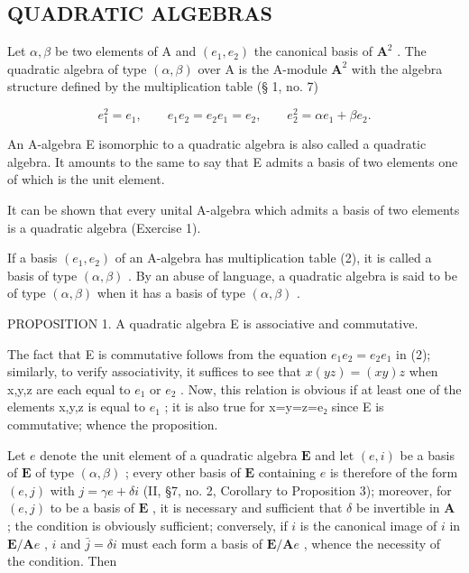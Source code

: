 \subsection{QUADRATIC ALGEBRAS}

Let \(\alpha, \beta\) be two elements of A and \((e_1, e_2)\) the canonical basis of \(\mathbf{A}^2\) . The quadratic algebra of type \((\alpha, \beta)\) over A is the A-module \(\mathbf{A}^2\) with the algebra structure defined by the multiplication table (§ 1, no. 7)

\[
e _ {1} ^ {2} = e _ {1}, \qquad e _ {1} e _ {2} = e _ {2} e _ {1} = e _ {2}, \qquad e _ {2} ^ {2} = \alpha e _ {1} + \beta e _ {2}.\tag{2}
\]

An A-algebra E isomorphic to a quadratic algebra is also called a quadratic algebra. It amounts to the same to say that E admits a basis of two elements one of which is the unit element.

It can be shown that every unital A-algebra which admits a basis of two elements is a quadratic algebra (Exercise 1).

If a basis \((e_{1}, e_{2})\) of an A-algebra has multiplication table (2), it is called a basis of type \((\alpha, \beta)\) . By an abuse of language, a quadratic algebra is said to be of type \((\alpha, \beta)\) when it has a basis of type \((\alpha, \beta)\) .

PROPOSITION 1. A quadratic algebra E is associative and commutative.

The fact that E is commutative follows from the equation \(e_{1}e_{2}=e_{2}e_{1}\) in (2); similarly, to verify associativity, it suffices to see that \(x(yz)=(xy)z\) when x,y,z are each equal to \(e_{1}\) or \(e_{2}\) . Now, this relation is obvious if at least one of the elements x,y,z is equal to \(e_{1}\) ; it is also true for x=y=z=e₂ since E is commutative; whence the proposition.

Let \(e\) denote the unit element of a quadratic algebra \(\mathbf{E}\) and let \((e, i)\) be a basis of \(\mathbf{E}\) of type \((\alpha, \beta)\) ; every other basis of \(\mathbf{E}\) containing \(e\) is therefore of the form \((e, j)\) with \(j = \gamma e + \delta i\) (II, §7, no. 2, Corollary to Proposition 3); moreover, for \((e, j)\) to be a basis of \(\mathbf{E}\) , it is necessary and sufficient that \(\delta\) be invertible in \(\mathbf{A}\) ; the condition is obviously sufficient; conversely, if \(i\) is the canonical image of \(i\) in \(\mathbf{E}/\mathbf{A}e\) , \(i\) and \(\bar{j} = \delta i\) must each form a basis of \(\mathbf{E}/\mathbf{A}e\) , whence the necessity of the condition. Then

